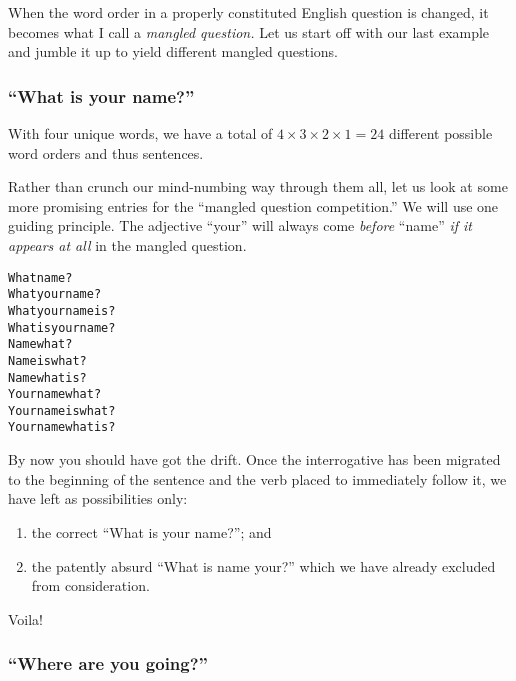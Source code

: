\documentclass[
  12pt,
  a4paper,
]{article}
\providecommand{\tightlist}{%
  \setlength{\itemsep}{0pt}\setlength{\parskip}{0pt}}
\newcommand\noun[1]{\textcolor{noun}{#1}}
\newcommand\pronoun[1]{\textcolor{pronoun}{#1}}
\newcommand\action[1]{\textcolor{action}{#1}}
\begin{document}
When the word order in a properly constituted English question is
changed, it becomes what I call a \emph{mangled question.} Let us start
off with our last example and jumble it up to yield different mangled
questions.

\hypertarget{what-is-your-name-1}{%
\subsubsection{``What is your name?''}\label{what-is-your-name-1}}

With four unique words, we have a total of
\(4 \times 3 \times 2 \times 1 = 24\) different possible word orders and
thus sentences.

Rather than crunch our mind-numbing way through them all, let us look at
some more promising entries for the ``mangled question competition.'' We
will use one guiding principle. The adjective ``your'' will always come
\emph{before} ``name'' \emph{if it appears at all} in the mangled
question.

\begin{tcolorbox}
\begin{alltt}
\color{normal}
What \noun{name}?
What \pronoun{your} \noun{name}?
What \pronoun{your} \noun{name} \action{is}?
What \action{is} \pronoun{your} \noun{name}?
\noun{Name} what?
\noun{Name} \action{is} what?
\noun{Name} what \action{is}?
\pronoun{Your} \noun{name} what?
\pronoun{Your} \noun{name} \action{is} what?
\pronoun{Your} \noun{name} what \action{is}?
\end{alltt}
\end{tcolorbox}

By now you should have got the drift. Once the interrogative has been
migrated to the beginning of the sentence and the verb placed to
immediately follow it, we have left as possibilities only:

\begin{enumerate}
\def\labelenumi{\alph{enumi}.}
\tightlist
\item
  the correct ``What is your name?''; and
\item
  the patently absurd ``What is name your?'' which we have already
  excluded from consideration.
\end{enumerate}

Voila!

\hypertarget{where-are-you-going-1}{%
\subsubsection{``Where are you going?''}\label{where-are-you-going-1}}
\end{document}

